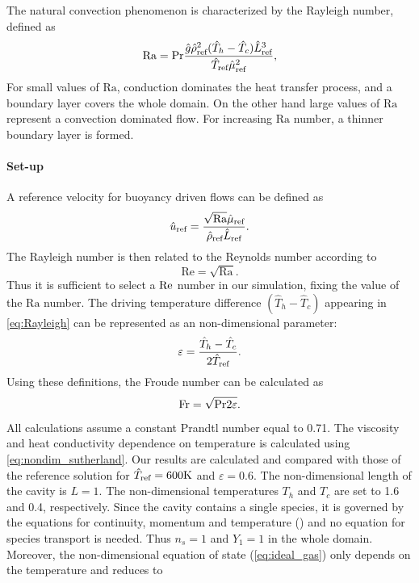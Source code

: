 The natural convection phenomenon is characterized by the Rayleigh number, defined as 
\begin{equation}\label{eq:Rayleigh}
\text{Ra} = \Prandtl \frac{\hat g \RefVal{\rho}^2(\hat T_h-\hat T_c) \RefVal{L}^3}{\RefVal{T}\RefVal{\mu}^2},
\end{equation}
For small values of $\text{Ra}$, conduction dominates the heat transfer process, and a boundary layer covers the whole domain. On the other hand large values of $\text{Ra}$ represent a convection dominated flow. For increasing $\text{Ra}$ number, a thinner boundary layer is formed. 

\paragraph{Set-up}
A reference velocity for buoyancy driven flows can be defined as\cite{vierendeelsBenchmarkSolutionsNatural2003}
\begin{equation}
\RefVal{u} = \frac{\sqrt{\text{Ra}} \RefVal{\mu}}{\RefVal{\rho}\RefVal{L}}.
\end{equation} 
The Rayleigh number is then related to the Reynolds number according to
\begin{equation}
\text{Re} = \sqrt{\text{Ra}}.
\end{equation}
Thus it is sufficient to select a $\Reynolds$ number in our simulation, fixing the value of the $\text{Ra}$ number. The driving temperature difference $(\hat T_h - \hat T_c)$ appearing in \cref{eq:Rayleigh} can be represented as an non-dimensional parameter:
\begin{equation}\label{eq:nondimensionalTemperature}
\varepsilon = \frac{\hat T_h - \hat T_c}{2\RefVal{T}}.
\end{equation}
Using these definitions, the Froude number can be calculated as 
\begin{equation}
\Froude = \sqrt{\Prandtl 2 \varepsilon}.
\end{equation}
All calculations assume a constant Prandtl number equal to 0.71. The viscosity and heat conductivity  dependence on temperature is calculated using \cref{eq:nondim_sutherland}.
Our results are calculated and compared with those of the reference solution for $\RefVal{T} = 600\si{K}$  and $\varepsilon = 0.6$. The non-dimensional length of the cavity is $L=1$. The non-dimensional temperatures $T_h$ and $T_c$ are set to 1.6 and 0.4, respectively. 
Since the cavity contains a single species, it is governed by the equations for continuity, momentum and temperature () and no equation for species transport is needed. Thus $n_s = 1$ and  $Y_1 = 1$ in the whole domain.  Moreover, the non-dimensional equation of state (\cref{eq:ideal_gas}) only depends on the temperature and reduces to
